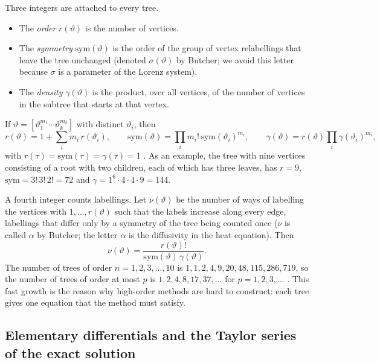 \documentclass[11pt,a4paper]{article}
\begin{document}
Three integers are attached to every tree.
\begin{itemize}[leftmargin=*]
\item The \emph{order} $r(\vartheta)$ is the number of vertices.
\item The \emph{symmetry} $\mathrm{sym}(\vartheta)$ is the order of the group of vertex relabellings that
leave the tree unchanged (denoted $\sigma(\vartheta)$ by Butcher; we avoid this letter because $\sigma$ is
a parameter of the Lorenz system).
\item The \emph{density} $\gamma(\vartheta)$ is the product, over all vertices, of the number of vertices
in the subtree that starts at that vertex.
\end{itemize}
If $\vartheta=[\vartheta_1^{m_1}\cdots\vartheta_k^{m_k}]$ with distinct $\vartheta_i$, then
\begin{equation}
r(\vartheta)=1+\sum_i m_i\,r(\vartheta_i),\qquad
\mathrm{sym}(\vartheta)=\prod_i m_i!\,\mathrm{sym}(\vartheta_i)^{m_i},\qquad
\gamma(\vartheta)=r(\vartheta)\prod_i\gamma(\vartheta_i)^{m_i},
\label{eq:treerec}
\end{equation}
with $r(\tau)=\mathrm{sym}(\tau)=\gamma(\tau)=1$ \cite[Thm.~301A]{butcher2008}. As an example, the tree with
nine vertices consisting of a root with two children, each of which has three leaves, has $r=9$,
$\mathrm{sym}=3!\,3!\,2!=72$ and $\gamma=1^6\cdot4\cdot4\cdot9=144$.

A fourth integer counts labellings. Let $\nu(\vartheta)$ be the number of ways of labelling the vertices with
$1,\dots,r(\vartheta)$ such that the labels increase along every edge, labellings that differ only by a
symmetry of the tree being counted once ($\nu$ is called $\alpha$ by Butcher; the letter $\alpha$ is the
diffusivity in the heat equation). Then \cite[Thm.~302A]{butcher2008}
\begin{equation}
\nu(\vartheta)=\frac{r(\vartheta)!}{\mathrm{sym}(\vartheta)\,\gamma(\vartheta)}.
\label{eq:nu}
\end{equation}
The number of trees of order $n=1,2,3,\dots,10$ is $1,1,2,4,9,20,48,115,286,719$, so the number of trees of
order at most $p$ is $1,2,4,8,17,37,\dots$ for $p=1,2,3,\dots$ \cite[Thm.~302B]{butcher2008}. This fast growth
is the reason why high-order methods are hard to construct: each tree gives one equation that the method
must satisfy.

\subsection{Elementary differentials and the Taylor series of the exact solution}\label{sec:elemdiff}
\end{document}
